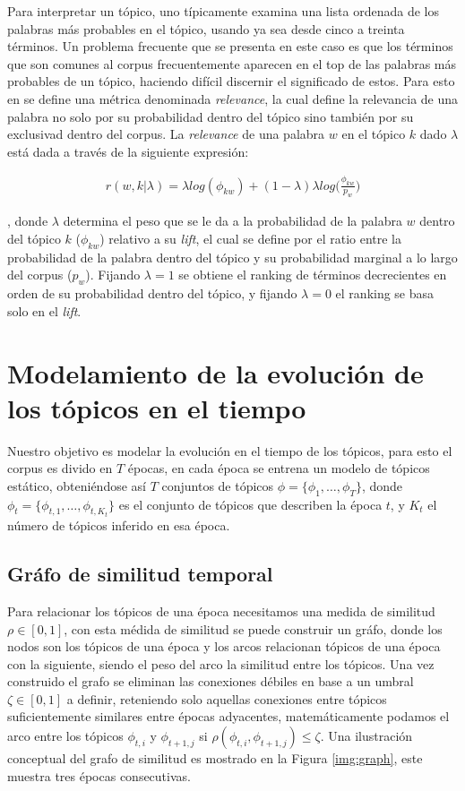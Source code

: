 \documentclass[letterpaper,12pt,oneside]{book} %
\begin{document}
Para interpretar un tópico, uno típicamente examina una lista ordenada de los palabras más probables en el tópico, usando ya sea desde cinco a treinta términos. Un problema frecuente que se presenta en este caso es que los términos que son comunes al corpus frecuentemente aparecen en el top de las palabras más probables de un tópico, haciendo difícil discernir el significado de estos.
Para esto en \citep{sievert2014ldavis} se define una métrica denominada \textit{relevance}, la cual define la relevancia de una palabra no solo por su probabilidad dentro del tópico sino también por su exclusivad dentro del corpus. La \textit{relevance} de una palabra $w$ en el tópico $k$ dado $\lambda$ está dada a través de la siguiente expresión:

\begin{align}
    r(w,k|\lambda) = \lambda log (\phi_{kw})+ (1-\lambda)\lambda log\bigg(\frac{\phi_{kw}}{p_{w}}\bigg)
\end{align}

, donde $\lambda$ determina el peso que se le da a la probabilidad de la palabra $w$ dentro del tópico $k$ ($\phi_{kw}$) relativo a su \textit{lift}, el cual se define por el ratio entre la probabilidad de la palabra dentro del tópico y su probabilidad marginal a lo largo del corpus ($p_w$). Fijando $\lambda=1$ se obtiene el ranking de términos decrecientes en orden de su probabilidad dentro del tópico, y fijando $\lambda=0$ el ranking se basa solo en el \textit{lift}.

\section{Modelamiento de la evolución de los tópicos en el tiempo}

Nuestro objetivo es modelar la evolución en el tiempo de los tópicos, para esto el corpus es divido en $T$ épocas, en cada época se entrena un modelo de tópicos estático, obteniéndose así $T$ conjuntos de tópicos $\phi=\{\phi_{1}, \ldots, \phi_{T}\}$, donde $\phi_{t}=\{\phi_{t,1}, \ldots, \phi_{t,K_{t}}\}$ es el conjunto de tópicos que describen la época $t$, y $K_{t}$ el número de tópicos inferido en esa época.

\subsection{Gráfo de similitud temporal}
Para relacionar los tópicos de una época necesitamos una medida de similitud $\rho \in [0,1]$, con esta médida de similitud se puede construir un gráfo, donde los nodos son los tópicos de una época y los arcos relacionan tópicos de una época con la siguiente, siendo el peso del arco la similitud entre los tópicos. Una vez construido el grafo se eliminan las conexiones débiles en base a un umbral $\zeta \in [0,1]$ a definir, reteniendo solo aquellas conexiones entre tópicos suficientemente similares entre épocas adyacentes, matemáticamente podamos el arco entre los tópicos $\phi_{t,i}$ y $\phi_{t+1,j}$ si $\rho(\phi_{t,i}, \phi_{t+1,j})\leq \zeta$. Una ilustración conceptual del grafo de similitud es mostrado en la Figura \ref{img:graph}, este muestra tres épocas consecutivas.
\end{document}
